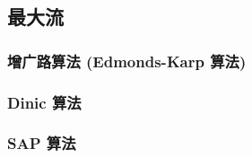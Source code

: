\subsection{最大流}
    \subsubsection{增广路算法 (Edmonds-Karp 算法)}
    \subsubsection{Dinic 算法}
    \subsubsection{SAP 算法}
